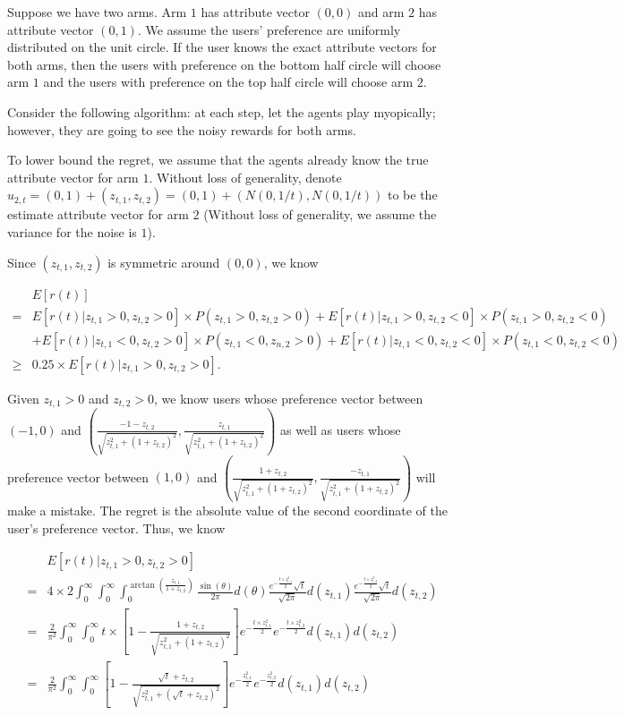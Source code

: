 \documentclass[twoside,11pt]{article}
\begin{document}
Suppose we have two arms. Arm $1$ has attribute vector $(0,0)$ and arm $2$ has attribute vector $(0,1)$. We assume the users' preference are uniformly distributed on the unit circle. If the user knows the exact attribute vectors for both arms, then the users with preference on the bottom half circle will choose arm $1$ and the users with preference on the top half circle will choose arm $2$.

Consider the following algorithm: at each step, let the agents play myopically; however, they are going to see the noisy rewards for both arms.

To lower bound the regret, we assume that the agents already know the true attribute vector for arm $1$. Without loss of generality, denote $u_{2,t} = (0,1)+(z_{t,1},z_{t,2}) = (0,1)+ (N(0,1/t),N(0,1/t))$ to be the estimate attribute vector for arm $2$ (Without loss of generality, we assume the variance for the noise is $1$). 

Since $(z_{t,1}, z_{t,2})$ is symmetric around $(0,0)$, we know 

\begin{align}
&E[r(t)] \nonumber \\
= &E[r(t) | z_{t,1}>0,z_{t,2}>0] \times P(z_{t,1}>0,z_{t,2}>0) + E[r(t) |z_{t,1}>0,z_{t,2}<0] \times P(z_{t,1}>0,z_{t,2}<0) \nonumber \\
&+E[r(t) | z_{t,1}<0,z_{t,2}>0] \times P(z_{t,1}<0,z_{n,2}>0) + E[r(t) |z_{t,1}<0,z_{t,2}<0] \times P(z_{t,1}<0,z_{t,2}<0) \nonumber \\
\geq & 0.25 \times E[r(t) | z_{t,1}>0, z_{t,2}>0]. \nonumber
\end{align}

Given $z_{t,1}>0$ and $z_{t,2}>0$, we know users whose preference vector between $(-1,0)$ and $\left(\frac{-1-z_{t,2}}{\sqrt{z_{t,1}^2+(1+z_{t,2})^2}}, \frac{z_{t,1}}{\sqrt{z_{t,1}^2+(1+z_{t,2})^2}}\right)$ as well as users whose preference vector between $(1,0)$ and $\left(\frac{1+z_{t,2}}{\sqrt{z_{t,1}^2+(1+z_{t,2})^2}}, \frac{-z_{t,1}}{\sqrt{z_{t,1}^2+(1+z_{t,2})^2}}\right)$ will make a mistake. The regret is the absolute value of the second coordinate of the user's preference vector. Thus, we know

\begin{align}
&E[r(t)| z_{t,1}>0, z_{t,2}>0] \nonumber \\
=& 4\times 2 \int_{0}^{\infty} \int_{0}^{\infty} \int_{0}^{\arctan\left(\frac{z_{t,1}}{1+z_{t,2}}\right)}\frac{\sin(\theta)}{2\pi}d(\theta)\frac{e^{-\frac{t \times z_{t,1}^2}{2}}\sqrt{t}}{\sqrt{2\pi}}d(z_{t,1})\frac{e^{-\frac{t \times z_{t,2}^2}{2}}\sqrt{t}}{\sqrt{2\pi}}d(z_{t,2}) \nonumber \\
=& \frac{2}{\pi^2}\int_{0}^{\infty} \int_{0}^{\infty}t\times \left[1-\frac{1+z_{t,2}}{\sqrt{z_{t,1}^2+(1+z_{t,2})^2}}\right]e^{-\frac{t \times z_{t,1}^2}{2}}e^{-\frac{t \times z_{t,2}^2}{2}}d(z_{t,1})d(z_{t,2}) \nonumber \\
=& \frac{2}{\pi^2}\int_{0}^{\infty} \int_{0}^{\infty} \left[1-\frac{\sqrt{t}+z_{t,2}}{\sqrt{z_{t,1}^2+(\sqrt{t}+z_{t,2})^2}}\right]e^{-\frac{z_{t,1}^2}{2}}e^{-\frac{z_{t,2}^2}{2}}d(z_{t,1})d(z_{t,2}) \nonumber 
\end{align}
\end{document}
